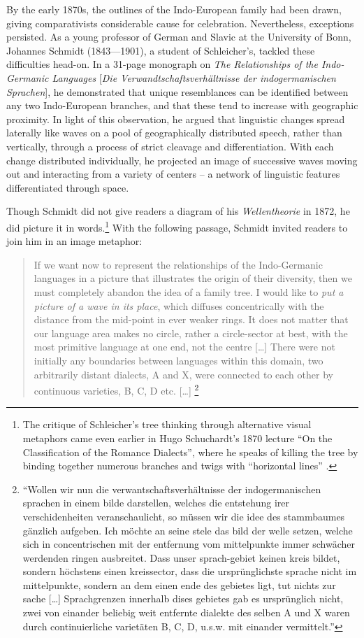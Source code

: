 \documentclass[output=paper]{langscibook}
\begin{document}
By the early 1870s, the outlines of the Indo-European family had been drawn, giving comparativists considerable cause for celebration. Nevertheless, exceptions persisted. As a young professor of German and Slavic at the University of Bonn, Johannes Schmidt (1843—1901), a student of Schleicher's, tackled these difficulties head-on. In a 31-page monograph on \emph{The Relationships of the Indo-Germanic Languages} [\emph{Die Verwandtschaftsverhältnisse der indo\-ger\-manischen Spra\-chen}], he demonstrated that unique resemblances can be identified between any two Indo-European branches, and that these tend to increase with geographic proximity. In light of this observation, he argued that linguistic changes spread laterally like waves on a pool of geographically distributed speech, rather than vertically, through a process of strict cleavage and differentiation. With each change distributed individually, he projected an image of successive waves moving out and interacting from a variety of centers -- a network of linguistic features differentiated through space.

Though Schmidt did not give readers a diagram of his \emph{Wellentheorie} in 1872, he did picture it in words.\footnote{The critique of Schleicher's tree thinking through alternative visual metaphors came even earlier in Hugo Schuchardt's 1870 lecture ``On the Classification of the Romance Dialects'', where he speaks of killing the tree by binding together numerous branches and twigs with ``horizontal lines'' \citep[11]{Schuchardt19001870}.} With the following passage, Schmidt invited readers to join him in an image metaphor:

\begin{quotation}
If we want now to represent the relationships of the Indo-Germanic languages in a picture that illustrates the origin of their diversity, then we must completely abandon the idea of a family tree. I would like to \emph{put a picture of a wave in its place}, which diffuses concentrically with the distance from the mid-point in ever weaker rings. It does not matter that our language area makes no circle, rather a circle-sector at best, with the most primitive language at	one end, not the centre […] There were not initially any boundaries between languages within this domain, two arbitrarily distant dialects, A and X, were connected to each other by continuous varieties, B, C, D etc. […] \citep[27--28]{Schmidt1872}\footnote{``Wollen wir nun die verwantschaftsverhältnisse der indogermanischen sprachen in einem bilde darstellen, welches die entstehung irer verschidenheiten veranschaulicht, so müssen wir die idee des stammbaumes gänzlich aufgeben. Ich möchte an seine stele das bild der welle setzen, welche sich in concentrischen mit der entfernung vom mittelpunkte immer schwächer werdenden ringen ausbreitet. Dass unser sprach-gebiet keinen kreis bildet, sondern höchstens einen kreissector, dass die ursprünglichste sprache nicht im mittelpunkte, sondern an dem einen ende des gebietes ligt, tut nichts zur sache […] Sprachgrenzen innerhalb dises gebietes gab es ursprünglich nicht, zwei von einander beliebig weit entfernte dialekte des selben A und X waren durch continuierliche varietäten B, C, D, u.s.w. mit einander vermittelt.''} 
\end{quotation}
\end{document}
